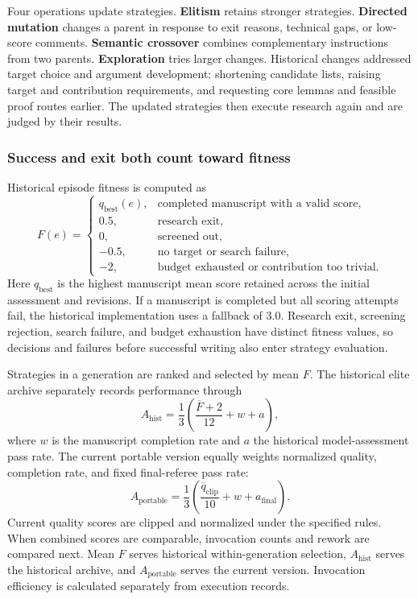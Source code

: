 Four operations update strategies. \textbf{Elitism} retains stronger strategies. \textbf{Directed mutation} changes a parent in response to exit reasons, technical gaps, or low-score comments. \textbf{Semantic crossover} combines complementary instructions from two parents. \textbf{Exploration} tries larger changes. Historical changes addressed target choice and argument development: shortening candidate lists, raising target and contribution requirements, and requesting core lemmas and feasible proof routes earlier. The updated strategies then execute research again and are judged by their results.

\subsubsection{Success and exit both count toward fitness}
Historical episode fitness is computed as
\begin{equation}
F(e)=\begin{cases}
q_{\mathrm{best}}(e),&\text{completed manuscript with a valid score},\\
0.5,&\text{research exit},\\
0,&\text{screened out},\\
-0.5,&\text{no target or search failure},\\
-2,&\text{budget exhausted or contribution too trivial}.
\end{cases}
\label{eq:historical-fitness}
\end{equation}
Here $q_{\mathrm{best}}$ is the highest manuscript mean score retained across the initial assessment and revisions. If a manuscript is completed but all scoring attempts fail, the historical implementation uses a fallback of 3.0. Research exit, screening rejection, search failure, and budget exhaustion have distinct fitness values, so decisions and failures before successful writing also enter strategy evaluation.

Strategies in a generation are ranked and selected by mean $F$. The historical elite archive separately records performance through
\begin{equation}
A_{\mathrm{hist}}=\frac{1}{3}\left(\frac{\overline F+2}{12}+w+a\right),
\label{eq:archive-fitness}
\end{equation}
where $w$ is the manuscript completion rate and $a$ the historical model-assessment pass rate. The current portable version equally weights normalized quality, completion rate, and fixed final-referee pass rate:
\begin{equation}
A_{\mathrm{portable}}=\frac{1}{3}\left(\frac{\overline q_{\mathrm{clip}}}{10}+w+a_{\mathrm{final}}\right).
\label{eq:portable-fitness}
\end{equation}
Current quality scores are clipped and normalized under the specified rules. When combined scores are comparable, invocation counts and rework are compared next. Mean $F$ serves historical within-generation selection, $A_{\mathrm{hist}}$ serves the historical archive, and $A_{\mathrm{portable}}$ serves the current version. Invocation efficiency is calculated separately from execution records.

